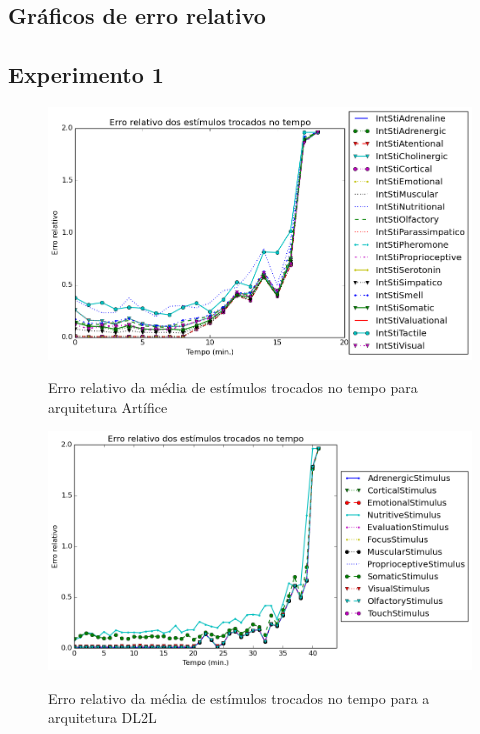 


\begin{apendicesenv}
\partapendices
\chapter{Gráficos de erro relativo}

\section{Experimento 1}
\label{ap:erroExp1}

\begin{figure}[H]
    \centering
    \caption{Erro relativo da média de estímulos trocados no tempo para arquitetura Artífice}
    \includegraphics[scale=0.6]{04-figuras/experiments/exp_1_artifice/avgExchangedStimuliOverTime_err.png}
    \label{fig:exchStimuli_artifice_err}
\end{figure}

\begin{figure}[H]
    \centering
    \caption{Erro relativo da média de estímulos trocados no tempo para a arquitetura DL2L}
    \includegraphics[scale=0.6]{04-figuras/experiments/exp_1_l2l/avgExchangedStimuliOverTime_err.png}
    \label{fig:exchStimuli_dl2l_err}
\end{figure}


\end{apendicesenv}
